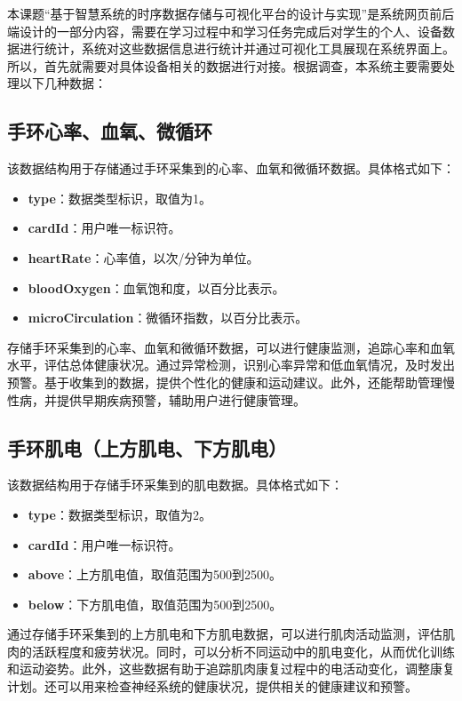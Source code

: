 \documentclass[oneside]{xduugthesis}
\begin{document}
本课题“基于智慧系统的时序数据存储与可视化平台的设计与实现”是系统网页前后端设计的一部分内容，需要在学习过程中和学习任务完成后对学生的个人、设备数据进行统计，系统对这些数据信息进行统计并通过可视化工具展现在系统界面上。所以，首先就需要对具体设备相关的数据进行对接。根据调查，本系统主要需要处理以下几种数据：

\subsection{手环心率、血氧、微循环}
该数据结构用于存储通过手环采集到的心率、血氧和微循环数据。具体格式如下：

\begin{itemize}[nosep]
    \item \textbf{type}：数据类型标识，取值为1。
    \item \textbf{cardId}：用户唯一标识符。
    \item \textbf{heartRate}：心率值，以次/分钟为单位。
    \item \textbf{bloodOxygen}：血氧饱和度，以百分比表示。
    \item \textbf{microCirculation}：微循环指数，以百分比表示。
\end{itemize}

存储手环采集到的心率、血氧和微循环数据，可以进行健康监测，追踪心率和血氧水平，评估总体健康状况。通过异常检测，识别心率异常和低血氧情况，及时发出预警。基于收集到的数据，提供个性化的健康和运动建议。此外，还能帮助管理慢性病，并提供早期疾病预警，辅助用户进行健康管理。

\subsection{手环肌电（上方肌电、下方肌电）}
该数据结构用于存储手环采集到的肌电数据。具体格式如下：

\begin{itemize}[nosep]
    \item \textbf{type}：数据类型标识，取值为2。
    \item \textbf{cardId}：用户唯一标识符。
    \item \textbf{above}：上方肌电值，取值范围为500到2500。
    \item \textbf{below}：下方肌电值，取值范围为500到2500。
\end{itemize}

通过存储手环采集到的上方肌电和下方肌电数据，可以进行肌肉活动监测，评估肌肉的活跃程度和疲劳状况。同时，可以分析不同运动中的肌电变化，从而优化训练和运动姿势。此外，这些数据有助于追踪肌肉康复过程中的电活动变化，调整康复计划。还可以用来检查神经系统的健康状况，提供相关的健康建议和预警。
\end{document}
